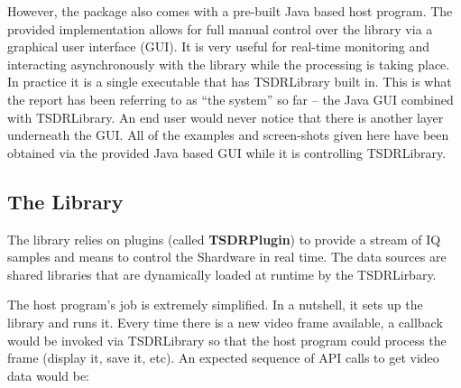 \documentclass[a4paper,12pt,twoside,openright]{report}
\begin{document}
However, the package also comes with a pre-built Java based host program. The provided implementation allows for full manual control over the library via a graphical user interface (GUI). It is very useful for real-time monitoring and interacting asynchronously with the library while the processing is taking place. In practice it is a single executable that has TSDRLibrary built in. This is what the report has been referring to as ``the system'' so far -- the Java GUI combined with TSDRLibrary. An end user would never notice that there is another layer underneath the GUI. All of the examples and screen-shots given here have been obtained via the provided Java based GUI while it is controlling TSDRLibrary.

\subsection{The Library}

The library relies on plugins (called \textbf{TSDRPlugin}) to provide a stream of IQ samples and means to control the Shardware in real time. The data sources are shared libraries that are dynamically loaded at runtime by the TSDRLirbary.

The host program's job is extremely simplified. In a nutshell, it sets up the library and runs it. Every time there is a new video frame available, a callback would be invoked via TSDRLibrary so that the host program could process the frame (display it, save it, etc). An expected sequence of API calls to get video data would be:
\end{document}
